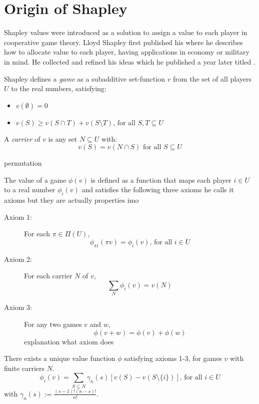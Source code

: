 \section{Origin of Shapley}
Shapley values were introduced as a solution to assign a value to each player in cooperative game theory.
Lloyd Shapley first published his \cite{shapley-1951} where he describes how to allocate value to each player, having applications in economy or military in mind. He collected and refined his ideas which he published a year later \cite{shapley-1952} titled .
\begin{definition}
    Shapley defines a \textit{game} as a subadditive set-function $v$ from the set of all players $U$ to the real numbers, satisfying: 
    \begin{itemize}
        \item $v(\emptyset)=0$
        \item $v(S) \geq v(S\cap T) +v(S\setminus T)\textrm{, for all } S,T\subseteq U$
    \end{itemize}  
\end{definition}
\begin{definition}
    A \textit{carrier} of $v$ is any set $N\subseteq U$ with:$$v(S)=v(N\cap S) \textrm{ for all }S \subseteq U$$
\end{definition}
\begin{definition}
    \color{red}permutation\color{black}
\end{definition}
\begin{definition}
    The value of a game $\phi(v)$ is defined as a function that maps each player $i\in U$ to a real number $\phi_i(v)$ and satisfies the following three axioms \color{red} he calls it axioms but they are actually properties imo \color{black}
    \begin{description}
        \item[Axiom 1:] For each $\pi \in \Pi(U)$, $$\phi_{\pi i}(\pi v) = \phi_i(v) \textrm{, for all } i \in U $$
        \item[Axiom 2:] For each carrier $N$ of $v$,
        $$\sum_N \phi_i(v) = v(N)$$
        \item[Axiom 3:] For any two games $v$ and $w$, 
        $$\phi(v+w)=\phi(v)+\phi(w)$$
        \color{red} explanation what axiom does \color{black}
    \end{description}
\end{definition}

\begin{theorem}
    There exists a unique value function $\phi$ satisfying axioms 1-3, for games $v$ with finite carriers $N$. 
    $$\phi_i(v) = \sum_{S\subseteq N} \gamma_n(s)[v(S)-v(S\setminus\{i\})] \textrm{, for all } i \in U$$
    with $\gamma_n(s):= \frac{(s-1)!(n-s)!}{n!}.$
\end{theorem}

